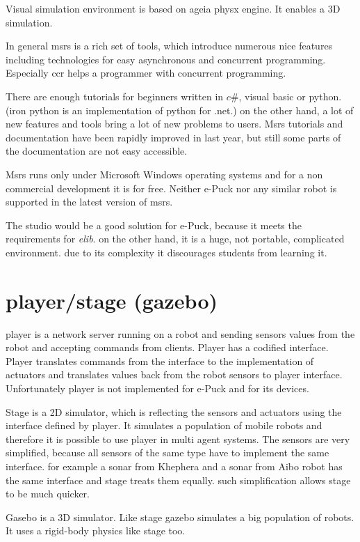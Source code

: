   Visual simulation environment is based on ageia physx engine. It enables a 3D simulation.
  
  In general msrs is a rich set of tools, which introduce numerous nice features including
  technologies for easy asynchronous and concurrent programming. Especially ccr helps
  a programmer with concurrent programming. 
  
  There are enough tutorials for beginners written
  in $c\#$, visual basic or python. (iron python is an implementation of python for .net.)
  on the other hand, a lot of new features and tools bring a lot of new problems to users.
  Msrs tutorials and documentation have been rapidly improved in last year, but still some parts
  of the documentation are not easy accessible.
  
  Msrs runs only under Microsoft Windows operating systems and for a non commercial development
  it is for free. Neither e-Puck nor any similar robot is supported in the latest version of msrs.
  
  The studio would be a good solution for e-Puck, because it meets the requirements for {\it elib}.
  on the other hand, it is a huge, not portable, complicated environment.
  due to its complexity it discourages students from learning it.
\section{player/stage (gazebo) \cite{player}}
  player is a network server running on a robot and sending sensors values from the robot and
  accepting commands from clients. Player has a codified interface. Player translates
  commands from the interface to the implementation of actuators and translates values back from the robot sensors 
  to player interface. Unfortunately player is not implemented for e-Puck
  and for its devices.
  
  Stage is a 2D simulator, which is reflecting the sensors and actuators using the interface defined by player.
  It simulates a population of mobile robots and therefore it is possible to use player 
  in multi agent systems.
  The sensors are very simplified, because all sensors of the same type 
  have to implement the same interface. for example a sonar from Khephera and a sonar from Aibo robot
  has the same interface and stage treats them equally. 
  such simplification allows stage to be much quicker.
  
  Gasebo is a 3D simulator. Like stage gazebo simulates a big population of robots.
  It uses a rigid-body physics like stage too.
  
